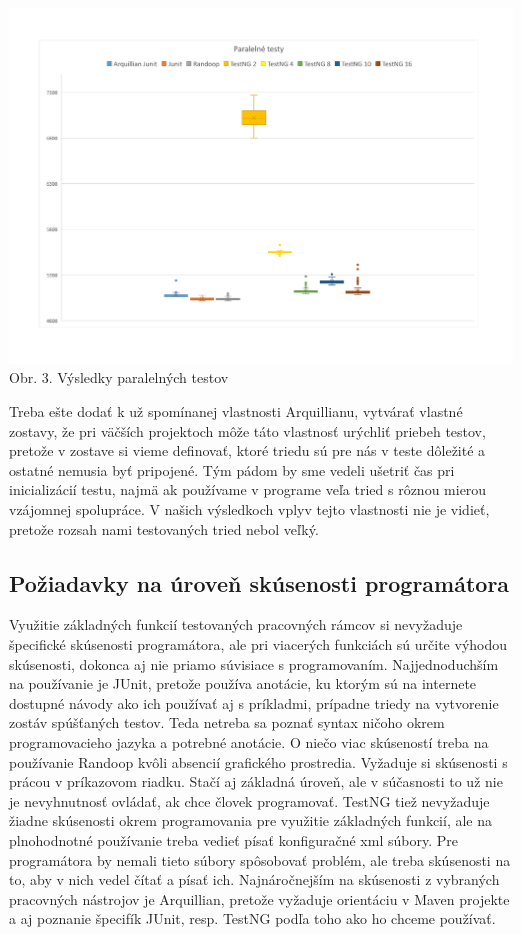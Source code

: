 \documentclass[11pt,twoside,slovak,a4paper]{article}
\begin{document}
	\begin{center}
		\includegraphics[width = 400pt]{graf_paralelne}
		\newline
		\tiny Obr. 3. Výsledky paralelných testov
	\end{center}
	
	Treba ešte dodať k už spomínanej vlastnosti Arquillianu, vytvárať vlastné zostavy, že pri väčších projektoch môže táto vlastnosť urýchliť priebeh testov, pretože v zostave si vieme definovať, ktoré triedu sú pre nás v teste dôležité a ostatné nemusia byť pripojené. Tým pádom by sme vedeli ušetriť čas pri inicializácií testu, najmä ak používame v programe veľa tried s rôznou mierou vzájomnej spolupráce. V našich výsledkoch vplyv tejto vlastnosti nie je vidieť, pretože rozsah nami testovaných tried nebol veľký.
	
	\subsection{Požiadavky na úroveň skúsenosti programátora}
	Využitie základných funkcií testovaných pracovných rámcov si nevyžaduje špecifické skúsenosti programátora, ale pri viacerých funkciách sú určite výhodou skúsenosti, dokonca aj nie priamo súvisiace s programovaním. Najjednoduchším na používanie je JUnit, pretože používa anotácie, ku ktorým sú na internete dostupné návody ako ich používať aj s príkladmi, prípadne triedy na vytvorenie zostáv spúšťaných testov. Teda netreba sa poznať syntax ničoho okrem programovacieho jazyka a potrebné anotácie. O niečo viac skúseností treba na používanie Randoop kvôli absencií grafického prostredia. Vyžaduje si skúsenosti s prácou v príkazovom riadku. Stačí aj základná úroveň, ale v súčasnosti to už nie je nevyhnutnosť ovládať, ak chce človek programovať. TestNG tiež nevyžaduje žiadne skúsenosti okrem programovania pre využitie základných funkcií, ale na plnohodnotné používanie treba vedieť písať konfiguračné xml súbory. Pre programátora by nemali tieto súbory spôsobovať problém, ale treba skúsenosti na to, aby v nich vedel čítať a písať ich. Najnáročnejším na skúsenosti z vybraných pracovných nástrojov je Arquillian, pretože vyžaduje orientáciu v Maven projekte a aj poznanie špecifík JUnit, resp. TestNG podľa toho ako ho chceme používať.
	
\end{document}
